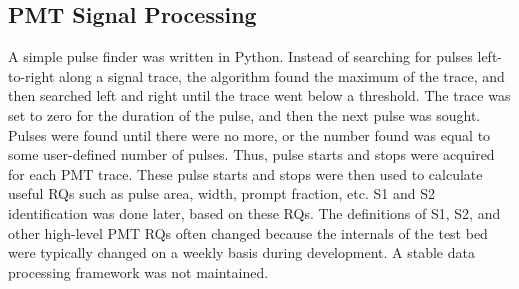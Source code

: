 \subsection{PMT Signal Processing}
A simple pulse finder was written in Python. Instead of searching for pulses left-to-right along a signal trace, the algorithm found the maximum of the trace, and then searched left and right until the trace went below a threshold. The trace was set to zero for the duration of the pulse, and then the next pulse was sought. Pulses were found until there were no more, or the number found was equal to some user-defined number of pulses. Thus, pulse starts and stops were acquired for each \ac{PMT} trace. These pulse starts and stops were then used to calculate useful \ac{RQ}s such as pulse area, width, prompt fraction, etc. S1 and S2 identification was done later, based on these \ac{RQ}s. The definitions of S1, S2, and other high-level \ac{PMT} \ac{RQ}s often changed because the internals of the test bed were typically changed on a weekly basis during development. A stable data processing framework was not maintained.

